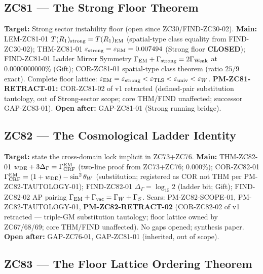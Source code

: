 \documentclass[11pt, a4paper]{article}
\begin{document}
\subsection{ZC81 --- The Strong Floor Theorem}

\begin{zcbox}[title={ZC81: THM-ZC81-01 --- Strong Floor Identity (Exact)}]
\sloppy
\textbf{Target:} Strong sector instability floor (open since ZC30/FIND-ZC30-02).
\textbf{Main:} LEM-ZC81-01 $T(R_1)_{\rm strong}=T(R_1)_{\rm EM}$
(spatial-type class equality from FIND-ZC30-02);
THM-ZC81-01 $\varepsilon_{\rm strong}=\varepsilon_{\rm EM}=0.007494$
(Strong floor \textbf{CLOSED});
FIND-ZC81-01 Ladder Mirror Symmetry
$\Gamma_{\rm EM}+\Gamma_{\rm strong}=2\Gamma_{\rm Weak}$ at
$0.0000000000\%$ (Gift);
COR-ZC81-01 spatial-type class theorem (ratio $25/9$ exact).
Complete floor lattice:
$\varepsilon_{\rm EM}=\varepsilon_{\rm strong}<\varepsilon_{\rm TLS}
<\varepsilon_{\rm univ}<\varepsilon_W$.
\textbf{PM-ZC81-RETRACT-01:} COR-ZC81-02 of v1 retracted (defined-pair
substitution tautology, out of Strong-sector scope; core THM/FIND
unaffected; successor GAP-ZC83-01).
\textbf{Open after:} GAP-ZC81-01 (Strong running bridge).
\end{zcbox}

\subsection{ZC82 --- The Cosmological Ladder Identity}

\begin{zcbox}[title={ZC82: THM-ZC82-01 --- Cosmological-Ladder Identity
  (Exact)}]
\sloppy
\textbf{Target:} state the cross-domain lock implicit in ZC73+ZC76.
\textbf{Main:} THM-ZC82-01 $w_{\rm DE}+3\Delta_\Gamma=\Gamma_{\rm CRF}^{\rm EM}$
(two-line proof from ZC73+ZC76; 0.000\%);
COR-ZC82-01 $\Gamma_{\rm CRF}^{\rm EM}=(1+w_{\rm DE})-\sin^2\theta_W$
(substitution; registered as COR not THM per PM-ZC82-TAUTOLOGY-01);
FIND-ZC82-01 $\Delta_\Gamma=\log_{15}2$ (ladder bit; Gift);
FIND-ZC82-02 AP pairing $\Gamma_{\rm EM}+\Gamma_{\rm vac}=\Gamma_W+\Gamma_S$.
Scars: PM-ZC82-SCOPE-01, PM-ZC82-TAUTOLOGY-01, \textbf{PM-ZC82-RETRACT-02}
(COR-ZC82-02 of v1 retracted --- triple-GM substitution tautology;
floor lattice owned by ZC67/68/69; core THM/FIND unaffected).
No gaps opened; synthesis paper.
\textbf{Open after:} GAP-ZC76-01, GAP-ZC81-01 (inherited, out of scope).
\end{zcbox}

\subsection{ZC83 --- The Floor Lattice Ordering Theorem}
\end{document}
